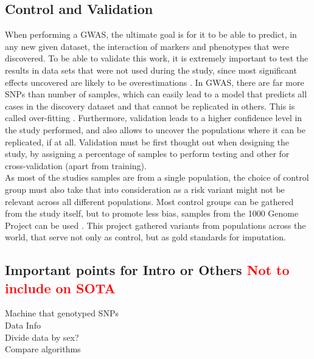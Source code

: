 \subsection{Control and Validation}
When performing a GWAS, the ultimate goal is for it to be able to predict, in any new given dataset, the interaction of markers and phenotypes that were discovered. To be able to validate this work, it is extremely important to test the results in data sets that were not used during the study, since most significant effects uncovered are likely to be overestimations \cite{xu2003theoretical}. In GWAS, there are far more SNPs than number of samples, which can easily lead to a model that predicts all cases in the discovery dataset and that cannot be replicated in others. This is called over-fitting \cite{hayes2001prediction}. Furthermore, validation leads to a higher confidence level in the study performed, and also allows to uncover the populations where it can be replicated, if at all. Validation must be first thought out when designing the study, by assigning a percentage of samples to perform testing and other for cross-validation (apart from training).\\
As most of the studies samples are from a single population, the choice of control group must also take that into consideration as a risk variant might not be relevant across all different populations. Most control groups can be gathered from the study itself, but to promote less bias, samples from the 1000 Genome Project can be used \cite{10002012integrated}. This project gathered variants from populations across the world, that serve not only as control, but as gold standards for imputation.\\

\subsection{Important points for Intro or Others \textcolor{red}{Not to include on SOTA}}
Machine that genotyped SNPs\\
Data Info\\
Divide data by sex? \\
Compare algorithms \\
